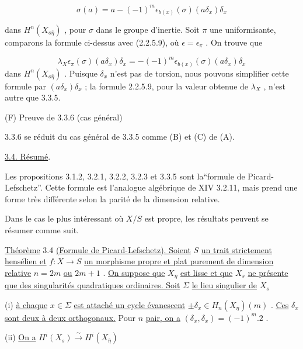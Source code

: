 \begin{equation*}
\sigma(a) = a - (-1)^m \epsilon_{b(x)}(\sigma)(a\delta_x)\delta_x 
\end{equation*}


 dans $H^n(X_{o\bar{\eta}})$ , pour $\sigma$ dans le groupe d'inertie. Soit $\pi$ une uniformisante, comparons la formule ci-dessus avec (2.2.5.9), où $\epsilon = \epsilon_{\pi}$ . On trouve que

\begin{equation*}
\lambda_X \epsilon_{\pi}(\sigma)(a\delta_x)\delta_x = - (-1)^m \epsilon_{b(x)}(\sigma)(a\delta_x)\delta_x
\end{equation*}
dans $H^n(X_{o\bar{\eta}})$ . Puisque $\delta_x$ n'est pas de torsion, nous pouvons simplifier cette formule par $(a\delta_x)\delta_x$ ; la formule 2.2.5.9, pour la valeur obtenue de $\lambda_X$ , n'est autre que 3.3.5.

(F) Preuve de 3.3.6 (cas général)

3.3.6 se réduit du cas général de 3.3.5 comme (B) et (C) de (A).


\underline{3.4. \quad Résumé}.

Les propositions 3.1.2, 3.2.1, 3.2.2, 3.2.3 et 3.3.5 sont la``formule de Picard-Lefschetz''. Cette formule est l'analogue algébrique de XIV 3.2.11, mais prend une forme très différente selon la parité de la dimension relative.

Dans le cas le plus intéressant où $X/S$ est propre, les résultats peuvent se résumer comme suit.

\underline{Théorème} 3.4 \underline{(Formule de Picard-Lefschetz). Soient} $S$ \underline{un trait strictement hensélien et} $f : X \to S$ \underline{un morphisme propre et plat purement de dimension relative} $n = 2m$ \underline{ou} $2m + 1$ . \underline{On suppose que} $X_{\eta}$ \underline{est lisse et que} $X_s$ \underline{ne présente que des singularités quadratiques ordinaires. Soit} $\Sigma$ \underline{le lieu singulier de} $X_s$

(i) \underline{à chaque} $x \in \Sigma$ \underline{est attaché un cycle évanescent} $\pm \delta_x \in H_n(X_{\bar{\eta}})(m)$ . \underline{Ces} $\delta_x$ \underline{sont deux à deux orthogonaux.} Pour $n$ \underline{pair, on a} $(\delta_x,\delta_x) = (-1)^m.2$ .

(ii) \underline{On a} \qquad $H^i(X_s) \xrightarrow{\ \sim\ } H^i(X_{\bar{\eta}})$

